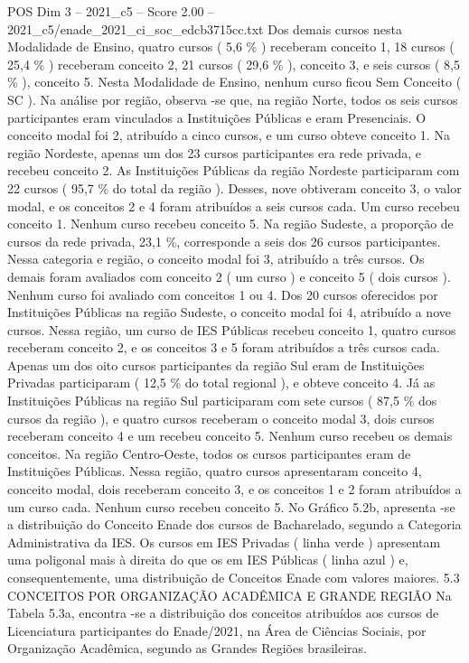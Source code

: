 \begin{textsample}{POS Dim 3 – 2021\_c5 – Score 2.00 – 2021\_c5/enade\_2021\_ci\_soc\_edcb3715cc.txt}
Dos demais cursos nesta Modalidade de Ensino, quatro cursos ( 5,6 \% ) receberam conceito 1, 18 cursos ( 25,4 \% ) receberam conceito 2, 21 cursos ( 29,6 \% ), conceito 3, e seis cursos ( 8,5 \% ), conceito 5.
Nesta Modalidade de Ensino, nenhum curso ficou Sem Conceito ( SC ).
Na análise por região, observa -se que, na região Norte, todos os seis cursos participantes eram vinculados a Instituições Públicas e eram Presenciais.
O conceito modal foi 2, atribuído a cinco cursos, e um curso obteve conceito 1.
Na região Nordeste, apenas um dos 23 cursos participantes era rede privada, e recebeu conceito 2.
As Instituições Públicas da região Nordeste participaram com 22 cursos ( 95,7 \% do total da região ).
Desses, nove obtiveram conceito 3, o valor modal, e os conceitos 2 e 4 foram atribuídos a seis cursos cada.
Um curso recebeu conceito 1.
Nenhum curso recebeu conceito 5.
Na região Sudeste, a proporção de cursos da rede privada, 23,1 \%, corresponde a seis dos 26 cursos participantes.
Nessa categoria e região, o conceito modal foi 3, atribuído a três cursos.
Os demais foram avaliados com conceito 2 ( um curso ) e conceito 5 ( dois cursos ).
Nenhum curso foi avaliado com conceitos 1 ou 4.
Dos 20 cursos oferecidos por Instituições Públicas na região Sudeste, o conceito modal foi 4, atribuído a nove cursos.
Nessa região, um curso de IES Públicas recebeu conceito 1, quatro cursos receberam conceito 2, e os conceitos 3 e 5 foram atribuídos a três cursos cada.
Apenas um dos oito cursos participantes da região Sul eram de Instituições Privadas participaram ( 12,5 \% do total regional ), e obteve conceito 4.
Já as Instituições Públicas na região Sul participaram com sete cursos ( 87,5 \% dos cursos da região ), e quatro cursos receberam o conceito modal 3, dois cursos receberam conceito 4 e um recebeu conceito 5.
Nenhum curso recebeu os demais conceitos.
Na região Centro-Oeste, todos os cursos participantes eram de Instituições Públicas.
Nessa região, quatro cursos apresentaram conceito 4, conceito modal, dois receberam conceito 3, e os conceitos 1 e 2 foram atribuídos a um curso cada.
Nenhum curso recebeu conceito 5.
No Gráfico 5.2b, apresenta -se a distribuição do Conceito Enade dos cursos de Bacharelado, segundo a Categoria Administrativa da IES.
Os cursos em IES Privadas ( linha verde ) apresentam uma poligonal mais à direita do que os em IES Públicas ( linha azul ) e, consequentemente, uma distribuição de Conceitos Enade com valores maiores. 5.3 CONCEITOS POR ORGANIZAÇÃO ACADÊMICA E GRANDE REGIÃO Na Tabela 5.3a, encontra -se a distribuição dos conceitos atribuídos aos cursos de Licenciatura participantes do Enade/2021, na Área de Ciências Sociais, por Organização Acadêmica, segundo as Grandes Regiões brasileiras.

\end{textsample}
